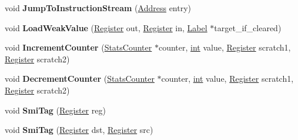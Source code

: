 \begin{DoxyCompactItemize}
\item 
\mbox{\label{classv8_1_1internal_1_1MacroAssembler_a18fc118dd1ecc3b59755acce49880671}} 
void {\bfseries Jump\+To\+Instruction\+Stream} (\mbox{\hyperlink{classuintptr__t}{Address}} entry)
\item 
\mbox{\label{classv8_1_1internal_1_1MacroAssembler_ab142a904bdb8e7d16e762655774c5284}} 
void {\bfseries Load\+Weak\+Value} (\mbox{\hyperlink{classv8_1_1internal_1_1Register}{Register}} out, \mbox{\hyperlink{classv8_1_1internal_1_1Register}{Register}} in, \mbox{\hyperlink{classv8_1_1internal_1_1Label}{Label}} $\ast$target\+\_\+if\+\_\+cleared)
\item 
\mbox{\label{classv8_1_1internal_1_1MacroAssembler_a7a18bd522429bd7c7f20cd2a4325249d}} 
void {\bfseries Increment\+Counter} (\mbox{\hyperlink{classv8_1_1internal_1_1StatsCounter}{Stats\+Counter}} $\ast$counter, \mbox{\hyperlink{classint}{int}} value, \mbox{\hyperlink{classv8_1_1internal_1_1Register}{Register}} scratch1, \mbox{\hyperlink{classv8_1_1internal_1_1Register}{Register}} scratch2)
\item 
\mbox{\label{classv8_1_1internal_1_1MacroAssembler_a989b426fe1ff4cb41c77b21f849fb370}} 
void {\bfseries Decrement\+Counter} (\mbox{\hyperlink{classv8_1_1internal_1_1StatsCounter}{Stats\+Counter}} $\ast$counter, \mbox{\hyperlink{classint}{int}} value, \mbox{\hyperlink{classv8_1_1internal_1_1Register}{Register}} scratch1, \mbox{\hyperlink{classv8_1_1internal_1_1Register}{Register}} scratch2)
\item 
\mbox{\label{classv8_1_1internal_1_1MacroAssembler_acf7c9f888b258ba74498dd2ccbb15285}} 
void {\bfseries Smi\+Tag} (\mbox{\hyperlink{classv8_1_1internal_1_1Register}{Register}} reg)
\item 
\mbox{\label{classv8_1_1internal_1_1MacroAssembler_a74b4779456ca00de03d435930010cc7d}} 
void {\bfseries Smi\+Tag} (\mbox{\hyperlink{classv8_1_1internal_1_1Register}{Register}} dst, \mbox{\hyperlink{classv8_1_1internal_1_1Register}{Register}} src)
\item 
\mbox{\label{classv8_1_1internal_1_1MacroAssembler_aa952efe697275bc5c5f66760023f78ea}} 

\end{DoxyCompactItemize}
